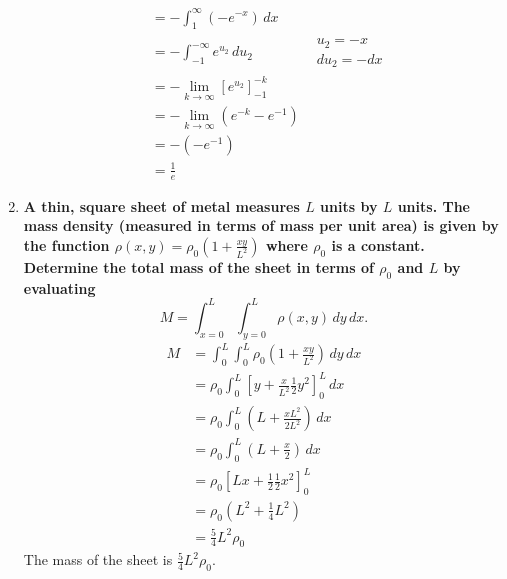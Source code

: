 \documentclass[11pt]{article}
\begin{document}
\begin{enumerate}[label=\textbf{\arabic*.}]
{\begin{enumerate}[label=\textbf{(\alph*)}]
{\begin{align*}
                        &=-\int_1^\infty(-e^{-x})\,dx \\
                        &=-\int_{-1}^{-\infty} e^{u_2}\,du_2 & \begin{matrix}u_2=-x \\ du_2=-dx\end{matrix} \\
                        &=-\lim_{k\to\infty}[e^{u_2}]_{-1}^{-k} \\
                        &=-\lim_{k\to\infty}(e^{-k}-e^{-1}) \\
                        &=-(-e^{-1}) \\
                        &=\frac{1}{e}
                    \end{align*}
                }
            \end{enumerate}
        }
        \item{
            \textbf{\boldmath A thin, square sheet of metal measures \(L\) units by \(L\) units. The mass density (measured in terms of mass per unit area) is given by the function \(\rho(x,y)=\rho_0\left(1+\frac{xy}{L^2}\right)\) where \(\rho_0\) is a constant. Determine the total mass of the sheet in terms of \(\rho_0\) and \(L\) by evaluating \[M=\int_{x=0}^L\int_{y=0}^L\rho(x,y)\,dy\,dx.\]}
            \begin{align*}
                M&=\int_0^L\int_0^L\rho_0\left(1+\frac{xy}{L^2}\right)\,dy\,dx \\
                &=\rho_0\int_0^L\left[y+\frac{x}{L^2}\frac{1}{2}y^2\right]_0^L\,dx \\
                &=\rho_0\int_0^L\left(L+\frac{xL^2}{2L^2}\right)\,dx \\
                &=\rho_0\int_0^L\left(L+\frac{x}{2}\right)\,dx \\
                &=\rho_0\left[Lx+\frac{1}{2}\frac{1}{2}x^2\right]_0^L \\
                &=\rho_0\left(L^2+\frac{1}{4}L^2\right) \\
                &=\frac{5}{4}L^2\rho_0
            \end{align*}
            The mass of the sheet is \(\frac{5}{4}L^2\rho_0\).
        }
    \end{enumerate}
\end{document}
